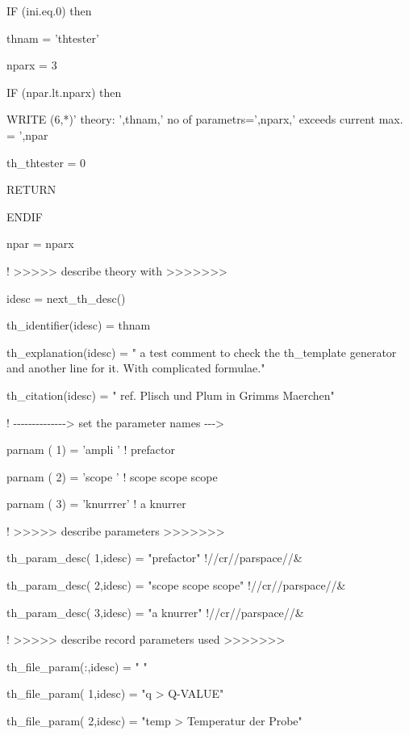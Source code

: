 \documentclass[]{article}
\begin{document}
IF (ini.eq.0) then

thnam = 'thtester'

nparx = 3

IF (npar.lt.nparx) then

WRITE (6,*)' theory: ',thnam,' no of parametrs=',nparx,' exceeds current
max. = ',npar

th\_thtester = 0

RETURN

ENDIF

npar = nparx

! \textgreater{}\textgreater{}\textgreater{}\textgreater{}\textgreater{}
describe theory with
\textgreater{}\textgreater{}\textgreater{}\textgreater{}\textgreater{}\textgreater{}\textgreater{}

idesc = next\_th\_desc()

th\_identifier(idesc) = thnam

th\_explanation(idesc) = " a test comment to check the th\_template
generator and another line for it. With complicated formulae."

th\_citation(idesc) = " ref. Plisch und Plum in Grimms Maerchen"

! -\/-\/-\/-\/-\/-\/-\/-\/-\/-\/-\/-\/-\/-\textgreater{} set the
parameter names -\/-\/-\textgreater{}

parnam ( 1) = 'ampli ' ! prefactor

parnam ( 2) = 'scope ' ! scope scope scope

parnam ( 3) = 'knurrrer' ! a knurrer

! \textgreater{}\textgreater{}\textgreater{}\textgreater{}\textgreater{}
describe parameters
\textgreater{}\textgreater{}\textgreater{}\textgreater{}\textgreater{}\textgreater{}\textgreater{}

th\_param\_desc( 1,idesc) = "prefactor" !//cr//parspace//\&

th\_param\_desc( 2,idesc) = "scope scope scope" !//cr//parspace//\&

th\_param\_desc( 3,idesc) = "a knurrer" !//cr//parspace//\&

! \textgreater{}\textgreater{}\textgreater{}\textgreater{}\textgreater{}
describe record parameters used
\textgreater{}\textgreater{}\textgreater{}\textgreater{}\textgreater{}\textgreater{}\textgreater{}

th\_file\_param(:,idesc) = " "

th\_file\_param( 1,idesc) = "q \textgreater{} Q-VALUE"

th\_file\_param( 2,idesc) = "temp \textgreater{} Temperatur der Probe"
\end{document}
